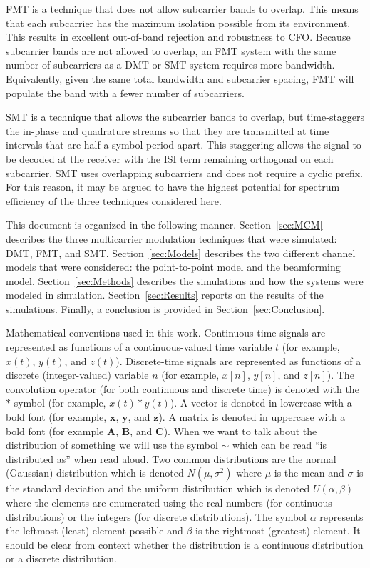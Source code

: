 \documentclass[conference]{IEEEtran}
\begin{document}
FMT is a technique that does not allow subcarrier bands to overlap. This means that
each subcarrier has the maximum isolation possible from its environment. This results
in excellent out-of-band rejection and robustness to CFO. Because subcarrier bands are
not allowed to overlap, an FMT system with the same number of subcarriers as a DMT or 
SMT system requires more bandwidth. Equivalently, given the same total bandwidth and
subcarrier spacing, FMT will populate the band with a fewer number of subcarriers.

SMT is a technique that allows the subcarrier bands to overlap, but time-staggers
the in-phase and quadrature streams so that they are transmitted at time intervals
that are half a symbol period apart. This staggering allows the signal to be 
decoded at the receiver with the ISI term remaining orthogonal on each subcarrier.
SMT uses overlapping subcarriers and does not require a cyclic prefix. For this
reason, it may be argued to have the highest potential for spectrum efficiency
of the three techniques considered here.

This document is organized in the following manner. Section~\ref{sec:MCM} 
describes the three multicarrier modulation techniques that were simulated:
DMT, FMT, and SMT. Section~\ref{sec:Models} describes the two different
channel models that were considered: the point-to-point model and the
beamforming model. Section~\ref{sec:Methods} describes the simulations
and how the systems were modeled in simulation. Section~\ref{sec:Results}
reports on the results of the simulations. Finally, a conclusion is 
provided in Section~\ref{sec:Conclusion}.

Mathematical conventions used in this work. Continuous-time signals are
represented as functions of a continuous-valued time variable $t$ (for
example, $x(t)$, $y(t)$, and $z(t)$). Discrete-time signals are represented
as functions of a discrete (integer-valued) variable $n$ (for example, 
$x[n]$, $y[n]$, and $z[n]$). The convolution operator (for both continuous
and discrete time) is denoted with the $*$ symbol (for example, $x(t) * y(t)$).
A vector is denoted in lowercase with a bold font (for example, $\mathbf{x}$, 
$\mathbf{y}$, and $\mathbf{z}$). A matrix is denoted in uppercase with a bold
font (for example $\mathbf{A}$, $\mathbf{B}$, and $\mathbf{C}$). When we want
to talk about the distribution of something we will use the symbol $\sim$ which
can be read ``is distributed as'' when read aloud. Two common distributions are
the normal (Gaussian) distribution which is denoted $N(\mu, \sigma^2)$ where
$\mu$ is the mean and $\sigma$ is the standard deviation and the uniform 
distribution which is denoted $U(\alpha, \beta)$ where the elements are
enumerated using the real numbers (for continuous distributions) or the 
integers (for discrete distributions). The symbol $\alpha$ represents the 
leftmost (least) element possible and $\beta$ is the rightmost (greatest) 
element. It should be clear from context whether the distribution is a
continuous distribution or a discrete distribution.
\end{document}

